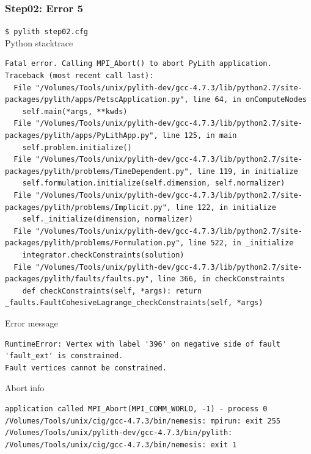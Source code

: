 \documentclass{beamer}
\newcommand{\cmd}[1]{{\tiny\tt \color{ltred}#1}}
\newcommand{\errlabel}[1]{{\small \color{blue}#1}}
\begin{document}
\begin{frame}[fragile]
  \frametitle{Step02: Error 5}

\cmd{\$ pylith step02.cfg}\\
\errlabel{Python stacktrace}
\begin{lstlisting}
Fatal error. Calling MPI_Abort() to abort PyLith application.
Traceback (most recent call last):
  File "/Volumes/Tools/unix/pylith-dev/gcc-4.7.3/lib/python2.7/site-packages/pylith/apps/PetscApplication.py", line 64, in onComputeNodes
    self.main(*args, **kwds)
  File "/Volumes/Tools/unix/pylith-dev/gcc-4.7.3/lib/python2.7/site-packages/pylith/apps/PyLithApp.py", line 125, in main
    self.problem.initialize()
  File "/Volumes/Tools/unix/pylith-dev/gcc-4.7.3/lib/python2.7/site-packages/pylith/problems/TimeDependent.py", line 119, in initialize
    self.formulation.initialize(self.dimension, self.normalizer)
  File "/Volumes/Tools/unix/pylith-dev/gcc-4.7.3/lib/python2.7/site-packages/pylith/problems/Implicit.py", line 122, in initialize
    self._initialize(dimension, normalizer)
  File "/Volumes/Tools/unix/pylith-dev/gcc-4.7.3/lib/python2.7/site-packages/pylith/problems/Formulation.py", line 522, in _initialize
    integrator.checkConstraints(solution)
  File "/Volumes/Tools/unix/pylith-dev/gcc-4.7.3/lib/python2.7/site-packages/pylith/faults/faults.py", line 366, in checkConstraints
    def checkConstraints(self, *args): return _faults.FaultCohesiveLagrange_checkConstraints(self, *args)
\end{lstlisting}
\errlabel{Error message}
\begin{lstlisting}
RuntimeError: Vertex with label '396' on negative side of fault 'fault_ext' is constrained.
Fault vertices cannot be constrained.
\end{lstlisting}
\errlabel{Abort info}
\begin{lstlisting}
application called MPI_Abort(MPI_COMM_WORLD, -1) - process 0
/Volumes/Tools/unix/cig/gcc-4.7.3/bin/nemesis: mpirun: exit 255
/Volumes/Tools/unix/pylith-dev/gcc-4.7.3/bin/pylith: /Volumes/Tools/unix/cig/gcc-4.7.3/bin/nemesis: exit 1
\end{lstlisting}

\end{frame}
\end{document}

